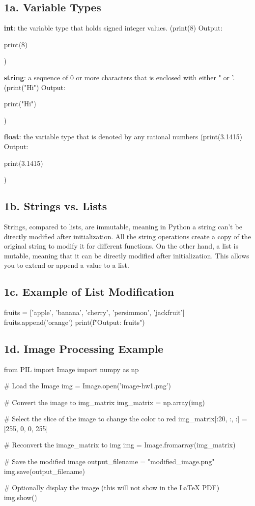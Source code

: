 \documentclass[12pt,letterpaper]{article}
\begin{document}
\subsection*{1a. Variable Types}

\textbf{int}: the variable type that holds signed integer values. (print(8) Output: 
\begin{pycode}
print(8)
\end{pycode}
)

\textbf{string}: a sequence of 0 or more characters that is enclosed with either " or '.(print("Hi") Output: 
\begin{pycode}
print("Hi")
\end{pycode}
)

\textbf{float}: the variable type that is denoted by any rational numbers (print(3.1415) Output: 
\begin{pycode}
print(3.1415)
\end{pycode}
)

\subsection*{1b. Strings vs. Lists}
Strings, compared to lists, are immutable, meaning in Python a string can't be directly modified after initialization. All the string operations create a copy of the original string to modify it for different functions. On the other hand, a list is mutable, meaning that it can be directly modified after initialization. This allows you to extend or append a value to a list.

\subsection*{1c. Example of List Modification}
\begin{pycode}
fruits = ['apple', 'banana', 'cherry', 'persimmon', 'jackfruit']
fruits.append('orange')
print(f"Output: {fruits}")
\end{pycode}

\subsection*{1d. Image Processing Example}

\begin{pycode}
from PIL import Image
import numpy as np

# Load the Image
img = Image.open('image-hw1.png')

# Convert the image to img_matrix
img_matrix = np.array(img)

# Select the slice of the image to change the color to red
img_matrix[:20, :, :] = [255, 0, 0, 255]

# Reconvert the image_matrix to img
img = Image.fromarray(img_matrix)

# Save the modified image
output_filename = "modified_image.png"
img.save(output_filename)

# Optionally display the image (this will not show in the LaTeX PDF)
img.show()
\end{pycode}
\end{document}
